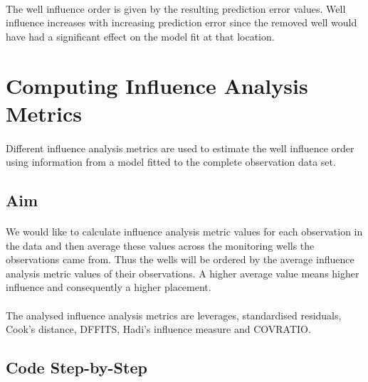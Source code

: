 \documentclass{article}
\begin{document}
\paragraph{}

The well influence order is given by the resulting prediction error values. Well influence increases with increasing prediction error since the removed well would have had a significant effect on the model fit at that location.

\section{Computing Influence Analysis Metrics}
\paragraph{}

Different influence analysis metrics are used to estimate the well influence order using information from a model fitted to the complete observation data set. 

\subsection{Aim}
\paragraph{}

We would like to calculate influence analysis metric values for each observation in the data and then average these values across the monitoring wells the observations came from. Thus the wells will be ordered by the average influence analysis metric values of their observations. A higher average value means higher influence and consequently a higher placement.

\paragraph{}

The analysed influence analysis metrics are leverages, standardised residuals, Cook's distance, DFFITS, Hadi's influence measure and COVRATIO.

\subsection{Code Step-by-Step}
\paragraph{}
\end{document}
